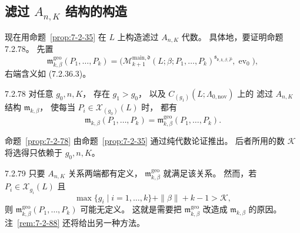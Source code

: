 
\subsection{滤过 $A_{n,K}$ 结构的构造}
\label{subsec:7-2-7}

现在用命题~\ref{prop:7-2-35}
在 $L$ 上构造滤过 $A_{n,K}$ 代数。
具体地，要证明命题 7.2.78。
先置
\begin{equation}
\mathfrak m^{\mathrm{geo}}_{k,\beta}
(P_1,\ldots,P_k)
=\bigl(
\mathcal M^{\mathrm{main},\mathfrak d}_{k+1}
(L;\beta;P_1,\ldots,P_k)
^{\mathfrak s_{\mathfrak d,k,\beta,\vec P}},
\operatorname{ev}_0\bigr),
\tag{7.2.77}\label{eq:7-2-77}
\end{equation}
右端含义如 (7.2.36.3)。

\begin{proposition}{7.2.78}\label{prop:7-2-78}
%
对任意 $g_0,n,K$，
存在 $g_1>g_0$，
以及 $C_{(g_1)}(L;\Lambda_{0,\mathrm{nov}})$ 上的
滤过 $A_{n,K}$ 结构 $\mathfrak m_{k,\beta}$，
使每当 $P_i\in\mathcal X_{(g_0)}(L)$ 时，
都有
\[
\mathfrak m_{k,\beta}(P_1,\ldots,P_k)
=\mathfrak m^{\mathrm{geo}}_{k,\beta}
(P_1,\ldots,P_k).
\]
\end{proposition}

命题~\ref{prop:7-2-78}
由命题~\ref{prop:7-2-35}
通过纯代数论证推出。
后者所用的数 $\mathcal K$ 将选得只依赖于
$g_0,n,K$。

\begin{remark}{7.2.79}\label{rem:7-2-79}
只要 $A_{n,K}$ 关系两端都有定义，
$\mathfrak m^{\mathrm{geo}}_{k,\beta}$ 就满足该关系。
然而，若 $P_i\in\mathcal X_{g_i}(L)$ 且
\[
\max\{g_i\mid i=1,\ldots,k\}
+\|\beta\|+k-1>\mathcal K,
\]
则 $\mathfrak m^{\mathrm{geo}}_{k,\beta}
(P_1,\ldots,P_k)$ 可能无定义。
这就是需要把
$\mathfrak m^{\mathrm{geo}}_{k,\beta}$
改造成 $\mathfrak m_{k,\beta}$ 的原因。
注~\ref{rem:7-2-88} 还将给出另一种方法。
\end{remark}

